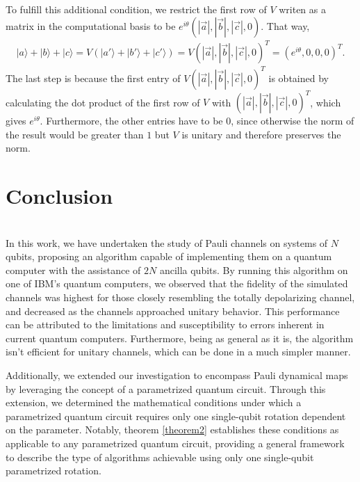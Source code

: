 \documentclass[10pt,letterpaper]{article} %
\begin{document}
To fulfill this additional condition,  we restrict the first row of
$V$ writen as a matrix in 
the computational basis to be $e^{i\theta} (|\vec{a}|, |\vec{b}|, |\vec{c}|,0)$. 
That way, 
\begin{align*}
|a\rangle + |b\rangle + |c\rangle = V (|a'\rangle + |b'\rangle + |c'\rangle ) = V(|\vec{a}|, |\vec{b}|, |\vec{c}|,0)^T = (e^{i\theta},0,0,0)^T.
\end{align*}
The last step is because the first entry of $V(|\vec{a}|, |\vec{b}|, |\vec{c}|,0)^T$
is obtained by calculating the dot product of the first row of $V$ with $(|\vec{a}|, |\vec{b}|, |\vec{c}|,0)^T$, which gives
$e^{i\theta}$. 
Furthermore, the other entries have to be $0$,
since otherwise the norm of the result would be greater than
$1$ but $V$ is unitary and therefore preserves the norm.





\section{Conclusion} %
\\

In this work, we have undertaken the study of Pauli channels on systems of $N$ qubits, 
proposing an algorithm capable of implementing them on a quantum computer
with the assistance of $2N$ ancilla qubits.
 By running this algorithm on one of IBM's quantum computers, 
we observed that the fidelity of the simulated channels was highest for those 
closely resembling the totally depolarizing channel, 
and decreased as the channels approached unitary behavior. 
This performance can be attributed to the limitations and susceptibility to errors 
inherent in current quantum computers. 
Furthermore, being as general as it is,
the algorithm isn’t efficient for unitary channels, 
which can be done in a much simpler manner.

Additionally, we extended our investigation 
to encompass Pauli dynamical maps by leveraging the concept of a parametrized quantum circuit. 
Through this extension, we determined the mathematical conditions under which a
parametrized quantum circuit requires only one single-qubit 
rotation dependent on the parameter. Notably, theorem \ref{theorem2} establishes these
 conditions as applicable to any parametrized quantum circuit, 
 providing a general framework to describe the type of algorithms achievable using 
only one single-qubit parametrized rotation.
\end{document}
